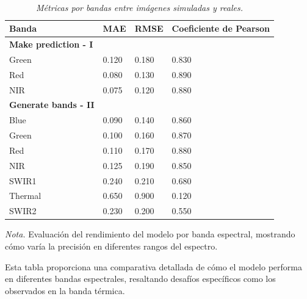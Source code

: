             \begin{table}[H]
                \caption{\doublespacing \\ \textit{Métricas por bandas entre imágenes simuladas y reales.}}
                \begin{spacing}{8}
                    \fontsize{8pt}{2pt}\selectfont  
                    \begin{tabularx}{\linewidth}{*{4}{X}} 
                        \toprule
                        \textbf{Banda} & \textbf{MAE} & \textbf{RMSE} & \textbf{Coeficiente de Pearson} \\ 
                        \midrule
                        \textbf{Make prediction - I} & & & \\
                        Green & 0.120 & 0.180 & 0.830 \\ 
                        Red & 0.080 & 0.130 & 0.890 \\ 
                        NIR & 0.075 & 0.120 & 0.880 \\
                        \midrule
                        \textbf{Generate bands - II} & & & \\
                        Blue & 0.090 & 0.140 & 0.860 \\ 
                        Green & 0.100 & 0.160 & 0.870 \\ 
                        Red & 0.110 & 0.170 & 0.880 \\ 
                        NIR & 0.125 & 0.190 & 0.850 \\ 
                        SWIR1 & 0.240 & 0.210 & 0.680 \\ 
                        Thermal & 0.650 & 0.900 & 0.120 \\ 
                        SWIR2 & 0.230 & 0.200 & 0.550 \\ 
                        \bottomrule
                    \end{tabularx}
                \end{spacing}
                \vspace{1\baselineskip}
                \textit{Nota.} Evaluación del rendimiento del modelo por banda espectral, mostrando cómo varía la precisión en diferentes rangos del espectro.
                \label{valores_metricas2}
            \end{table}
            
            Esta tabla proporciona una comparativa detallada de cómo el modelo performa en diferentes bandas espectrales, resaltando desafíos específicos como los observados en la banda térmica.

